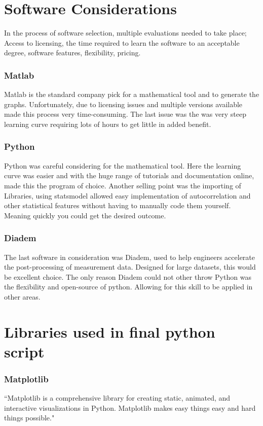 \section{Software Considerations}

\raggedright
In the process of software selection, multiple evaluations needed to take place; Access to licensing, the time required to learn the software to an acceptable degree, software features, flexibility, pricing. 

\subsubsection{Matlab}

Matlab is the standard company pick for a mathematical tool and to generate the graphs. Unfortunately, due to licensing issues and multiple versions available made this process very time-consuming. The last issue was the was very steep learning curve requiring lots of hours to get little in added benefit.

\subsubsection{Python}

Python was careful considering for the mathematical tool. Here the learning curve was easier and with the huge range of tutorials and documentation online, made this the program of choice. Another selling point was the importing of Libraries, using statsmodel allowed easy implementation of autocorrelation and other statistical features without having to manually code them yourself. Meaning quickly you could get the desired outcome.

\subsubsection{Diadem}

The last software in consideration was Diadem, used to help engineers accelerate the post-processing of measurement data. Designed for large datasets, this would be excellent choice. The only reason Diadem could not other throw Python was the flexibility and open-source of python. Allowing for this skill to be applied in other areas. 

\section{Libraries used in final python script}
\subsubsection{Matplotlib}
``Matplotlib is a comprehensive library for creating static, animated, and interactive visualizations in Python. Matplotlib makes easy things easy and hard things possible." \cite{matplotlib}

